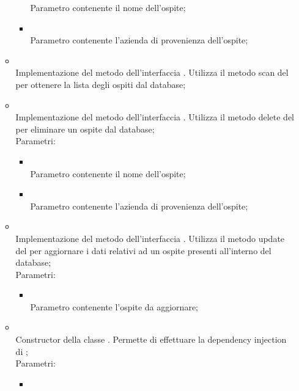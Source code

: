 \begin{itemize}
\begin{itemize}
\begin{itemize}
			Parametro contenente il nome dell'ospite;
			\item {} \\
			Parametro contenente l'azienda di provenienza dell'ospite;
		\end{itemize}
		\item[]  \\
		Implementazione del metodo dell'interfaccia . Utilizza il metodo scan del  per ottenere la lista degli ospiti dal database;\\
		\item[]  \\
		Implementazione del metodo dell'interfaccia . Utilizza il metodo delete del  per eliminare un ospite dal database;\\
		Parametri:
		\begin{itemize}
			\item {} \\
			Parametro contenente il nome dell'ospite;
			\item {} \\
			Parametro contenente l'azienda di provenienza dell'ospite;
		\end{itemize}
		\item[]  \\
		Implementazione del metodo dell'interfaccia . Utilizza il metodo update del  per aggiornare i dati relativi ad un ospite presenti all'interno del database;\\
		Parametri:
		\begin{itemize}
			\item {} \\
			Parametro contenente l'ospite da aggiornare;
		\end{itemize}
		\item[]  \\
		Constructor della classe . Permette di effettuare la dependency injection di ;\\
		Parametri:
		\begin{itemize}
			\item {} \\

\end{itemize}
\end{itemize}
\end{itemize}
